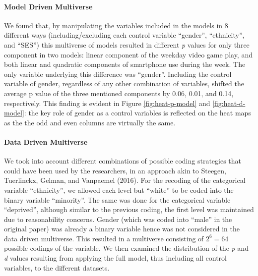 \documentclass[man]{apa6}
\theoremstyle{definition}
\theoremstyle{definition}
\theoremstyle{definition}
\theoremstyle{remark}
\begin{document}
\hypertarget{model-driven-multiverse}{%
\paragraph{Model Driven Multiverse}\label{model-driven-multiverse}}

We found that, by manipulating the variables included in the models in 8
different ways (including/excluding each control variable
\enquote{gender}, \enquote{ethnicity}, and \enquote{SES}) this
multiverse of models resulted in different \emph{p} values for only
three component in two models: linear component of the weekday video
game play, and both linear and quadratic components of smartphone use
during the week. The only variable underlying this difference was
\enquote{gender}. Including the control variable of gender, regardless
of any other combination of variables, shifted the average p value of
the three mentioned components by 0.06, 0.01, and 0.14, respectively.
This finding is evident in Figure \ref{fig:heat-p-model} and
\ref{fig:heat-d-model}: the key role of gender as a control variables is
reflected on the heat maps as the the odd and even columns are virtually
the same.

\hypertarget{data-driven-multiverse}{%
\paragraph{Data Driven Multiverse}\label{data-driven-multiverse}}

We took into account different combinations of possible coding
strategies that could have been used by the researchers, in an approach
akin to Steegen, Tuerlinckx, Gelman, and Vanpaemel (2016). For the
recoding of the categorical variable \enquote{ethnicity}, we allowed
each level but \enquote{white} to be coded into the binary variable
\enquote{minority}. The same was done for the categorical variable
\enquote{deprived}, although similar to the previous coding, the first
level was maintained due to reasonability concerns. Gender (which was
coded into \enquote{male} in the original paper) was already a binary
variable hence was not considered in the data driven multiverse. This
resulted in a multiverse consisting of \(2^6 = 64\) possible codings of
the variable. We then examined the distribution of the \emph{p} and
\emph{d} values resulting from applying the full model, thus including
all control variables, to the different datasets.
\end{document}
